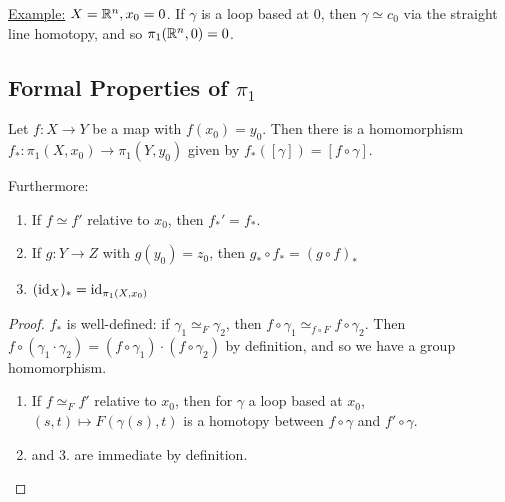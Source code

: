 \documentclass[10pt,a4paper]{article}
\begin{document}
\underline{Example:} $X=\mathbb{R}^n, x_0 = 0$. If $\gamma$ is a loop based at $0$, then $\gamma\simeq c_0$ via the straight line homotopy, and so $\pi_1(\mathbb{R}^n, 0) = 0$.

\subsection*{Formal Properties of $\pi_1$}
\begin{lemma}
Let $f:X\rightarrow Y$ be a map with $f(x_0) = y_0$. Then there is a homomorphism $f_{\ast}:\pi_1(X,x_0)\rightarrow\pi_1(Y,y_0)$ given by $f_\ast([\gamma]) = [f\circ \gamma]$.

Furthermore:
\begin{enumerate}
\item If $f\simeq f'$ relative to $x_0$, then $f_\ast ' = f_\ast$.
\item If $g:Y\rightarrow Z$ with $g(y_0) = z_0$, then $g_\ast \circ f_\ast = (g\circ f)_\ast$
\item $(\operatorname{id}_X)_\ast = \operatorname{id}_{\pi_1(X,x_0)}$
\end{enumerate}
\end{lemma}

\begin{proof}
$f_\ast$ is well-defined: if $\gamma_1 \simeq_F \gamma_2$, then $f\circ\gamma_1 \simeq_{f\circ F} f\circ \gamma_2$. Then $f\circ(\gamma_1\cdot \gamma_2) = (f\circ \gamma_1)\cdot(f\circ \gamma_2)$ by definition, and so we have a group homomorphism.
\begin{enumerate}
\item If $f\simeq_F f'$ relative to $x_0$, then for $\gamma$ a loop based at $x_0$, $(s,t)\mapsto F(\gamma(s),t)$ is a homotopy between $f\circ \gamma$ and $f'\circ \gamma$.
\item and 3. are immediate by definition.
\end{enumerate}
\end{proof}
\end{document}
